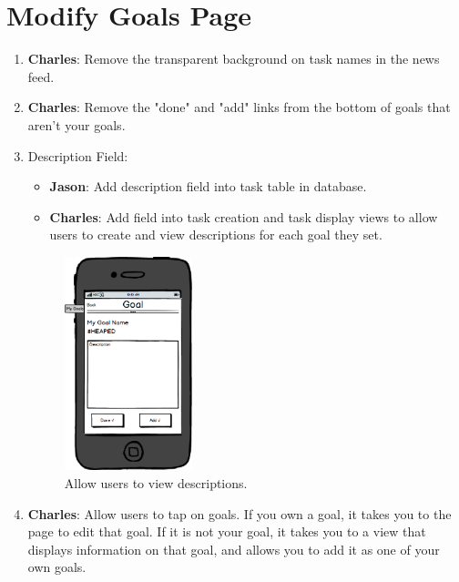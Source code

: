 \documentclass[12pt]{article}
\begin{document}
\section{Modify Goals Page}
\begin{enumerate}
\item \textbf{Charles}: Remove the transparent background on task names in the news feed.
\item \textbf{Charles}: Remove the "done" and "add" links from the bottom of goals that aren't your goals.
\item Description Field:
	\begin{itemize}
	\item \textbf{Jason}: Add description field into task table in database.
	\item \textbf{Charles}: Add field into task creation and task display views to allow users to create and view descriptions for each goal they set.
	\end{itemize}
	
\begin{figure}[htbp]
    \centering
    \includegraphics[width=0.35\textwidth]{view_description.png}
    \caption{Allow users to view descriptions.}
    \label{fig:view_desc}
\end{figure}
	
\item \textbf{Charles}: Allow users to tap on goals.  If you own a goal, it takes you to the page to edit that goal.  If it is not your goal, it takes you to a view that displays information on that goal, and allows you to add it as one of your own goals.
\end{enumerate}
\end{document}
